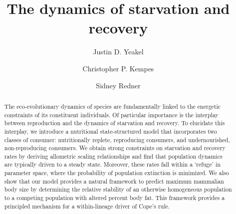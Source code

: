 \documentclass[twocolumn,preprintnumbers,amsmath,amssymb,superscriptaddress]{revtex4}
\begin{document}
\author{Justin D. Yeakel} 

\author{Christopher P. Kempes} 

\author{Sidney Redner} 

\title{The dynamics of starvation and recovery}%


\begin{abstract} %
The eco-evolutionary dynamics of species are fundamentally linked to the energetic constraints of its constituent individuals. 
Of particular importance is the interplay between reproduction and the dynamics of starvation and recovery. %
To elucidate this interplay, we introduce a nutritional state-structured model that incorporates two classes of consumer: nutritionally replete, reproducing consumers, and undernourished, non-reproducing consumers. %
We obtain strong constraints on starvation and recovery rates by deriving allometric scaling relationships and find that population dynamics are typically driven to a steady state. %
Moreover, these rates fall within a `refuge' in parameter space, where the probability of population extinction is minimized. 
We also show that our model provides a natural framework to predict
maximum mammalian body size by determining the relative stability of an
otherwise homogeneous population to a competing population with altered percent
body fat. This framework provides a principled mechanism for a within-lineage driver of
Cope's rule.
\end{abstract}
\end{document}
